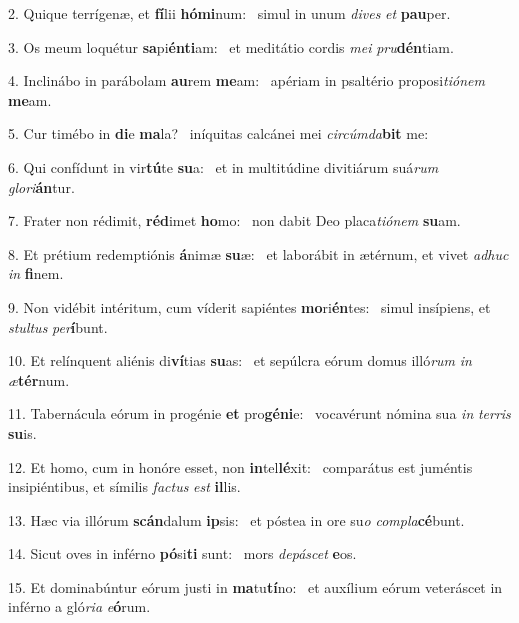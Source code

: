 2. Quique terrígenæ, et \textbf{fí}lii \textbf{hó}\textbf{mi}num: \ast\  simul in unum \textit{di}\textit{ves} \textit{et} \textbf{pau}per.\

3. Os meum loquétur \textbf{sa}pi\textbf{én}\textbf{ti}am: \ast\  et meditátio cordis \textit{me}\textit{i} \textit{pru}\textbf{dén}tiam.\

4. Inclinábo in parábolam \textbf{au}rem \textbf{me}am: \ast\  apériam in psaltério proposi\textit{ti}\textit{ó}\textit{nem} \textbf{me}am.\

5. Cur timébo in \textbf{di}e \textbf{ma}la? \ast\  iníquitas calcánei mei \textit{cir}\textit{cúm}\textit{da}\textbf{bit} me:\

6. Qui confídunt in vir\textbf{tú}te \textbf{su}a: \ast\  et in multitúdine divitiárum suá\textit{rum} \textit{glo}\textit{ri}\textbf{án}tur.\

7. Frater non rédimit, \textbf{réd}imet \textbf{ho}mo: \ast\  non dabit Deo placa\textit{ti}\textit{ó}\textit{nem} \textbf{su}am.\

8. Et prétium redemptiónis \textbf{á}nimæ \textbf{su}æ: \ast\  et laborábit in ætérnum, et vivet \textit{ad}\textit{huc} \textit{in} \textbf{fi}nem.\

9. Non vidébit intéritum, cum víderit sapiéntes \textbf{mo}ri\textbf{én}tes: \ast\  simul insípiens, et \textit{stul}\textit{tus} \textit{per}\textbf{í}bunt.\

10. Et relínquent aliénis di\textbf{ví}tias \textbf{su}as: \ast\  et sepúlcra eórum domus illó\textit{rum} \textit{in} \textit{æ}\textbf{tér}num.\

11. Tabernácula eórum in progénie \textbf{et} pro\textbf{gé}\textbf{ni}e: \ast\  vocavérunt nómina sua \textit{in} \textit{ter}\textit{ris} \textbf{su}is.\

12. Et homo, cum in honóre esset, non \textbf{in}tel\textbf{lé}xit: \ast\  comparátus est juméntis insipiéntibus, et símilis \textit{fac}\textit{tus} \textit{est} \textbf{il}lis.\

13. Hæc via illórum \textbf{scán}dalum \textbf{ip}sis: \ast\  et póstea in ore su\textit{o} \textit{com}\textit{pla}\textbf{cé}bunt.\

14. Sicut oves in inférno \textbf{pó}si\textbf{ti} sunt: \ast\  mors \textit{de}\textit{pá}\textit{scet} \textbf{e}os.\

15. Et dominabúntur eórum justi in \textbf{ma}tu\textbf{tí}no: \ast\  et auxílium eórum veteráscet in inférno a gló\textit{ri}\textit{a} \textit{e}\textbf{ó}rum.\

